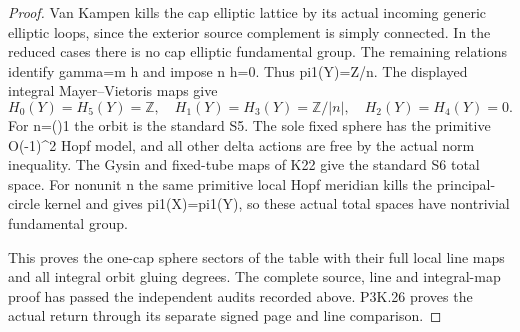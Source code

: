 \begin{proof}
Van Kampen kills the cap elliptic lattice by its actual incoming
generic elliptic loops, since the exterior source complement is
simply connected. In the reduced cases there is no cap elliptic
fundamental group. The remaining relations identify gamma=m h
and impose n h=0. Thus pi1(Y)=Z/\textbar n\textbar. The displayed integral
Mayer--Vietoris maps give
\[
 H_0(Y)=H_5(Y)=\mathbb Z,\quad
 H_1(Y)=H_3(Y)=\mathbb Z/|n|,\quad H_2(Y)=H_4(Y)=0.       \tag{SC.4}
\]
For n=(\pm)1 the orbit is the standard S5. The sole fixed sphere has
the primitive O(-1)\^{}2 Hopf model, and all other delta actions are
free by the actual norm inequality. The Gysin and fixed-tube maps
of K22 give the standard S6 total space. For nonunit n the
same primitive local Hopf meridian kills the principal-circle
kernel and gives pi1(X)=pi1(Y), so these actual total spaces
have nontrivial fundamental group.

This proves the one-cap sphere sectors of the table with their
full local line maps and all integral orbit gluing degrees.
The complete source, line and integral-map proof has passed the
independent audits recorded above. P3K.26 proves the actual return
through its separate signed page and line comparison.
\end{proof}